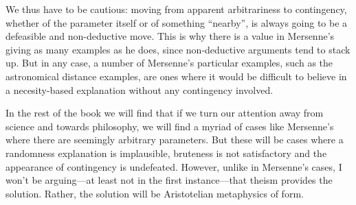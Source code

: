 We thus have to be cautious: moving from apparent arbitrariness to contingency, whether of the parameter itself or of something ``nearby'', is
always going to be a defeasible and non-deductive move. This is why there is a value in Mersenne's giving as many examples as he does, since 
non-deductive arguments tend to stack up. But in any case, a number of Mersenne's particular examples, such as the astronomical distance examples, 
are ones where it would be difficult to believe in a necesity-based explanation without any contingency involved. 

In the rest of the book we will find that if we turn our attention away from science and towards philosophy, we will
find a myriad of cases like Mersenne's where there are seemingly arbitrary parameters. But these will be cases where
a randomness explanation is implausible, bruteness is not satisfactory and the appearance of contingency is undefeated. However, 
unlike in Mersenne's cases, I won't be arguing---at least not in the first instance---that theism provides the solution. Rather, the 
solution will be Aristotelian metaphysics of form.
\chaptertail 

